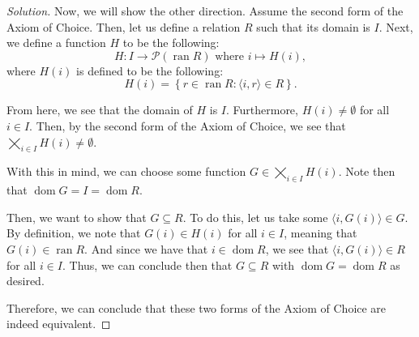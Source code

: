 \documentclass{article}
\newenvironment{solution}{\begin{proof}[Solution]}{\end{proof}}
\renewcommand\qedsymbol{$\blacksquare$}
\newenvironment{innerproof}{\renewcommand{\qedsymbol}{$\square$}\proof}{\endproof}
\DeclareMathOperator*{\dom}{\mathrm{dom}}
\DeclareMathOperator*{\ran}{\mathrm{ran}}
\newcommand{\pr}[1]{\left( {#1} \right)}
\newcommand{\brc}[1]{ \left\{  {#1} \right\}}
\newcommand{\ang}[1]{\langle {#1} \rangle}
\begin{document}
\begin{solution}
		Now, we will show the other direction.
		\begin{innerproof}
			Assume the second form of the Axiom of Choice. Then, let us define a relation $R$ such that its domain is $I$. Next, we define a function $H$ to be the following:
			\begin{equation*}
				H: I \rightarrow \mathscr{P}\pr{\ran R} \text{ where }i \mapsto H(i),
			\end{equation*}
			where $H(i)$ is defined to be the following:
			\begin{equation*}
				H(i) = \brc{r \in \ran{R} : \ang{i, r} \in R}.
			\end{equation*}
		
			From here, we see that the domain of $H$ is $I$. Furthermore, $H(i) \neq \emptyset$ for all $i \in I$. Then, by the second form of the Axiom of Choice, we see that $\bigtimes_{i \in I} H(i) \neq \emptyset$.
			
			With this in mind, we can choose some function $G \in \bigtimes_{i \in I} H(i)$. Note then that $\dom G = I = \dom R$.
			
			Then, we want to show that $G \subseteq R$. To do this, let us take some $\ang{i, G(i)} \in G$. By definition, we note that $G(i) \in H(i)$ for all $i \in I$, meaning that $G(i) \in \ran R$. And since we have that $i \in \dom R$, we see that $\ang{i, G(i)} \in R$ for all $i \in I$. Thus, we can conclude then that $G \subseteq R$ with $\dom G = \dom R$ as desired.
		\end{innerproof}
	
		Therefore, we can conclude that these two forms of the Axiom of Choice are indeed equivalent.
	\end{solution}
\end{document}
